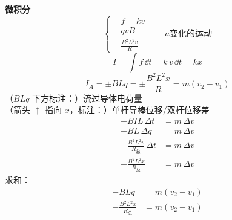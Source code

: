 \textbf{微积分}
\[
\left\{\begin{aligned}
&f=kv\\
&qvB\\
&\frac{B^2L^2v}{R}
\end{aligned}\right.
\qquad a\text{变化的运动}
\]
\[
I=\int f\,\dd t=k\,v\,\dd t=kx
\]
\[
I_A=\pm BLq=\pm\frac{B^2L^2x}{R}=m(v_2-v_1)
\]
（$BLq$ 下方标注：）流过导体电荷量\\
（箭头 $\uparrow$ 指向 $x$，标注：）单杆导棒位移/双杆位移差
\begin{align*}
-BIL\,\Delta t&=m\,\Delta v\\
-BL\,\Delta q&=m\,\Delta v\\
-\frac{B^2L^2v}{R_{\text{总}}}\,\Delta t&=m\,\Delta v\\
-\frac{B^2L^2x}{R_{\text{总}}}&=m\,\Delta v
\end{align*}
求和：
\begin{align*}
-BLq&=m(v_2-v_1)\\
-\frac{B^2L^2x}{R_{\text{总}}}&=m(v_2-v_1)
\end{align*}
